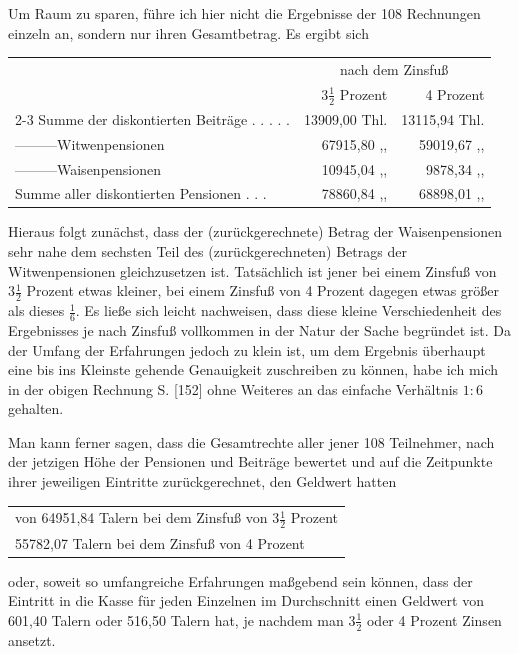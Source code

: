 Um Raum zu sparen, führe ich hier nicht die Ergebnisse der 108 Rechnungen einzeln an, sondern nur ihren Gesamtbetrag. Es ergibt sich
\begin{center}
\footnotesize\setlength{\tabcolsep}{3pt}
\begin{tabular}{l r|r}
&\multicolumn{2}{c}{nach dem Zinsfuß}\\
&\(3\tfrac{1}{2}\) Prozent&4 Prozent\\\cline{2-3}
Summe der diskontierten Beiträge . . . . .&13909,00 Thl.&13115,94 Thl.\\
—\quad —\quad —\quad Witwenpensionen&67915,80 ,, &59019,67 ,, \\
—\quad —\quad —\quad Waisenpensionen&10945,04 ,, &9878,34 ,, \\
Summe aller diskontierten Pensionen . . .&78860,84 ,, &68898,01 ,,
\end{tabular}
\end{center}
\noindent\hspace*{\parindent}Hieraus folgt zunächst, dass der (zurückgerechnete) Betrag der Waisenpensionen sehr nahe dem sechsten Teil des (zurückgerechneten) Betrags der Witwenpensionen gleichzusetzen ist. Tatsächlich ist jener bei einem Zinsfuß von \(3\tfrac{1}{2}\) Prozent etwas kleiner, bei einem Zinsfuß von 4 Prozent dagegen etwas größer als dieses \(\tfrac{1}{6}\). Es ließe sich leicht nachweisen, dass diese kleine Verschiedenheit des Ergebnisses je nach Zinsfuß vollkommen in der Natur der Sache begründet ist. Da der Umfang der Erfahrungen jedoch zu klein ist, um dem Ergebnis überhaupt eine bis ins Kleinste gehende Genauigkeit zuschreiben zu können, habe ich mich in der obigen Rechnung S. [152] ohne Weiteres an das einfache Verhältnis \(1:6\) gehalten.

Man kann ferner sagen, dass die Gesamtrechte aller jener 108 Teilnehmer, nach der jetzigen Höhe der Pensionen und Beiträge bewertet und auf die Zeitpunkte ihrer jeweiligen Eintritte zurückgerechnet, den Geldwert hatten
\begin{center}
\begin{tabular}{l}
von 64951,84 Talern bei dem Zinsfuß von \(3\tfrac{1}{2}\) Prozent\\
\phantom{von }55782,07 Talern bei dem Zinsfuß von 4 Prozent
\end{tabular}
\end{center}
\noindent oder, soweit so umfangreiche Erfahrungen maßgebend sein können, dass der Eintritt in die Kasse für jeden Einzelnen im Durchschnitt einen Geldwert von 601,40 Talern oder 516,50 Talern hat, je nachdem man \(3\tfrac{1}{2}\) oder 4 Prozent Zinsen ansetzt.

